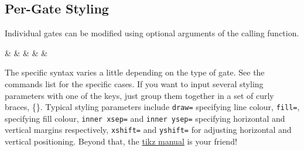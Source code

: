 \documentclass[aps,pra,10pt,nofootinbib]{revtex4-2}
\begin{document}
\subsection{Per-Gate Styling}

Individual gates can be modified using optional arguments of the calling function. 
\begin{Code}
\begin{quantikz}
&  & \phase[style={green},label style={label position=above}]{\beta} &  & & \meter[style={draw=blue}]{\ket{\pm}}
\end{quantikz}
\end{Code}
The specific syntax varies a little depending on the type of gate. See the commands list for the specific cases.
If you want to input several styling parameters with one of the keys, just group them together in a set of curly braces, \{\}. Typical styling parameters include \verb!draw=! specifying line colour, \verb!fill=!, specifying fill colour, \verb!inner xsep=! and \verb!inner ysep=! specifying horizontal and vertical margins respectively, \verb!xshift=! and \verb!yshift=! for adjusting horizontal and vertical positioning. Beyond that, the \href{http://mirrors.ctan.org/graphics/pgf/base/doc/pgfmanual.pdf}{tikz manual} is your friend!
\end{document}
